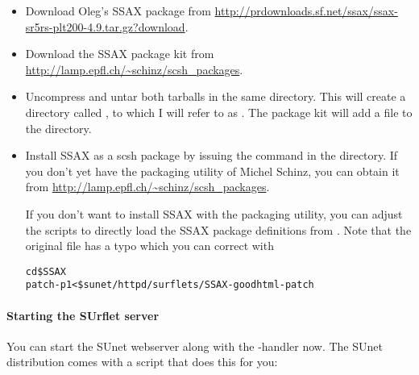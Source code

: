 \begin{itemize}
  \item Download Oleg's SSAX package from
  \url{http://prdownloads.sf.net/ssax/ssax-sr5rs-plt200-4.9.tar.gz?download}.

  \item Download the SSAX package kit from
     \url{http://lamp.epfl.ch/~schinz/scsh_packages}.  

  \item Uncompress and untar both tarballs in the same directory.
  This will create a directory called , to which I will
  refer to as .  The package kit will add a file
   to the  directory.

  \item Install SSAX as a scsh package by issuing the command
   in the
   directory.  If you don't yet have the packaging
  utility of Michel Schinz, you can obtain it from
  \url{http://lamp.epfl.ch/~schinz/scsh_packages}.

  If you don't want to install SSAX with the packaging utility, you
  can adjust the scripts to directly load the SSAX package definitions
  from .  Note that the original file
  has a typo which you can correct with

  \begin{alltt}
    cd \$SSAX
    patch -p1 < \$sunet/httpd/surflets/SSAX-goodhtml-patch
  \end{alltt}


\end{itemize}

\paragraph{Starting the SUrflet server} 
 You can start the SUnet webserver along with the
\surflet-handler now.  The SUnet distribution comes with a script that
does this for you:

